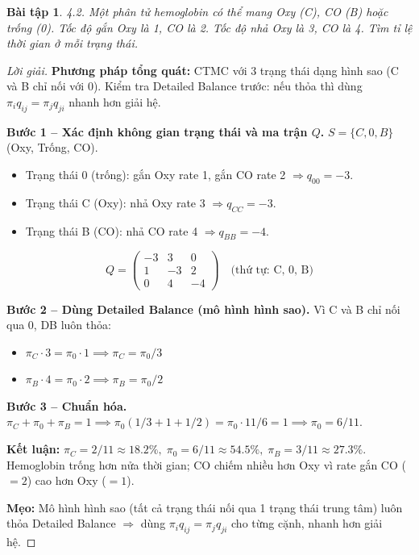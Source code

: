 \documentclass[8pt,a4paper]{article}
\newtheorem{exercise}{Bài tập}
\newenvironment{solution}{\begin{proof}[Lời giải]}{\end{proof}}
\begin{document}
\begin{exercise}
4.2. Một phân tử hemoglobin có thể mang Oxy (C), CO (B) hoặc trống (0). Tốc độ gắn Oxy là 1, CO là 2. Tốc độ nhả Oxy là 3, CO là 4. Tìm tỉ lệ thời gian ở mỗi trạng thái.
\end{exercise}
\begin{solution}
\textbf{Phương pháp tổng quát:} CTMC với 3 trạng thái dạng hình sao (C và B chỉ nối với 0). Kiểm tra Detailed Balance trước: nếu thỏa thì dùng $\pi_i q_{ij} = \pi_j q_{ji}$ nhanh hơn giải hệ.

\textbf{Bước 1 -- Xác định không gian trạng thái và ma trận $Q$.} $S = \{C, 0, B\}$ (Oxy, Trống, CO).
\begin{itemize}[nosep]
\item Trạng thái 0 (trống): gắn Oxy rate 1, gắn CO rate 2 $\Rightarrow q_{00} = -3$.
\item Trạng thái C (Oxy): nhả Oxy rate 3 $\Rightarrow q_{CC} = -3$.
\item Trạng thái B (CO): nhả CO rate 4 $\Rightarrow q_{BB} = -4$.
\end{itemize}
\[
Q = \begin{pmatrix}
-3 & 3 & 0 \\
1 & -3 & 2 \\
0 & 4 & -4
\end{pmatrix}
\quad \text{(thứ tự: C, 0, B)}
\]

\textbf{Bước 2 -- Dùng Detailed Balance (mô hình hình sao).} Vì C và B chỉ nối qua 0, DB luôn thỏa:
\begin{itemize}[nosep]
\item $\pi_C \cdot 3 = \pi_0 \cdot 1 \implies \pi_C = \pi_0/3$
\item $\pi_B \cdot 4 = \pi_0 \cdot 2 \implies \pi_B = \pi_0/2$
\end{itemize}

\textbf{Bước 3 -- Chuẩn hóa.} $\pi_C + \pi_0 + \pi_B = 1 \implies \pi_0(1/3 + 1 + 1/2) = \pi_0 \cdot 11/6 = 1 \implies \pi_0 = 6/11$.

\textbf{Kết luận:} $\boxed{\pi_C = 2/11 \approx 18.2\%,\; \pi_0 = 6/11 \approx 54.5\%,\; \pi_B = 3/11 \approx 27.3\%}$. Hemoglobin trống hơn nửa thời gian; CO chiếm nhiều hơn Oxy vì rate gắn CO ($=2$) cao hơn Oxy ($=1$).

\textbf{Mẹo:} Mô hình hình sao (tất cả trạng thái nối qua 1 trạng thái trung tâm) luôn thỏa Detailed Balance $\Rightarrow$ dùng $\pi_i q_{ij} = \pi_j q_{ji}$ cho từng cặnh, nhanh hơn giải hệ.
\end{solution}
\end{document}
